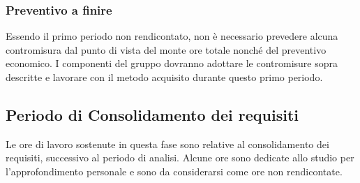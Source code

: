 \subsubsection{Preventivo a finire} 
Essendo il primo periodo non rendicontato, non è necessario prevedere alcuna contromisura dal punto di vista del monte ore totale nonché del preventivo economico. I componenti del gruppo dovranno adottare le contromisure sopra descritte e lavorare con il metodo acquisito durante questo primo periodo.

\subsection{Periodo di Consolidamento dei requisiti}
Le ore di lavoro sostenute in questa fase sono relative al consolidamento dei requisiti, successivo al periodo di analisi. Alcune ore sono dedicate allo studio per l'approfondimento personale e sono da considerarsi come ore non rendicontate.

